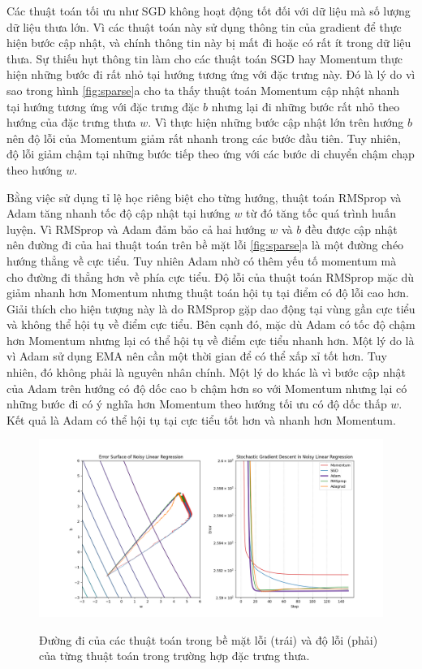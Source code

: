 Các thuật toán tối ưu như SGD không hoạt động tốt đối với dữ liệu mà số lượng dữ liệu thưa lớn. Vì các thuật toán này sử dụng thông tin của gradient để thực hiện bước cập nhật, và chính thông tin này bị mất đi hoặc có rất ít trong dữ liệu thưa. Sự thiếu hụt thông tin làm cho các thuật toán SGD hay Momentum thực hiện những bước đi rất nhỏ tại hướng tương ứng với đặc trưng này. Đó là lý do vì sao trong hình \ref{fig:sparse}a cho ta thấy thuật toán Momentum cập nhật nhanh tại hướng tương ứng với đặc trưng đặc $b$ nhưng lại đi những bước rất nhỏ theo hướng của đặc trưng thưa $w$. Vì thực hiện những bước cập nhật lớn trên hướng $b$ nên độ lỗi của Momentum giảm rất nhanh trong các bước đầu tiên. Tuy nhiên, độ lỗi giảm chậm tại những bước tiếp theo ứng với các bước di chuyển chậm chạp theo hướng $w$.

Bằng việc sử dụng tỉ lệ học riêng biệt cho từng hướng, thuật toán RMSprop và Adam tăng nhanh tốc độ cập nhật tại hướng $w$ từ đó tăng tốc quá trình huấn luyện. Vì RMSprop và Adam đảm bảo cả hai hướng $w$ và $b$ đều được cập nhật nên đường đi của hai thuật toán trên bề mặt lỗi \ref{fig:sparse}a là một đường chéo hướng thẳng về cực tiểu. Tuy nhiên Adam nhờ có thêm yếu tố momentum mà cho đường đi thẳng hơn về phía cực tiểu. Độ lỗi của thuật toán RMSprop mặc dù giảm nhanh hơn Momentum nhưng thuật toán hội tụ tại điểm có độ lỗi cao hơn. Giải thích cho hiện tượng này là do RMSprop gặp dao động tại vùng gần cực tiểu và không thể hội tụ về điểm cực tiểu. Bên cạnh đó, mặc dù Adam có tốc độ chậm hơn Momentum nhưng lại có thể hội tụ về điểm cực tiểu nhanh hơn. Một lý do là vì Adam sử dụng EMA nên cần một thời gian để có thể xấp xỉ tốt hơn. Tuy nhiên, đó không phải là nguyên nhân chính. Một lý do khác là vì bước cập nhật của Adam trên hướng có độ dốc cao b chậm hơn so với Momentum nhưng lại có những bước đi có ý nghĩa hơn Momentum theo hướng tối ưu có độ dốc thấp $w$. Kết quả là Adam có thể hội tụ tại cực tiểu tốt hơn và nhanh hơn Momentum.

\begin{figure}[htp]
	\centering
	\includegraphics[width=140 mm]{images/noise.png}
	\label{fig:noise}
	\caption{Đường đi của các thuật toán trong bề mặt lỗi (trái) và độ lỗi (phải) của từng thuật toán trong trường hợp đặc trưng thưa.}
\end{figure}

